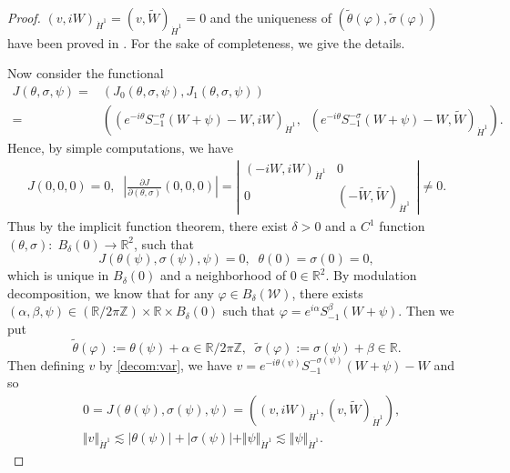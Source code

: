 \documentclass[reqno, 11pt]{amsart}
\numberwithin{equation}{section}
\newcommand{\Z}{{\mathbb{Z}}}
\newcommand{\R}{\mathbb{R}}
\theoremstyle{plain}
\theoremstyle{definition}
\numberwithin{equation}{section}
\numberwithin{theorem}{section}
\numberwithin{equation}{section}
\numberwithin{equation}{section}
\numberwithin{theorem}{section}
\begin{document}
	\begin{proof}
		$(v,iW)_{\dot H^1}=(v,\widetilde{W})_{\dot H^1}=0$ and the uniqueness of $(\widetilde{\theta}(\varphi),\widetilde{\sigma}(\varphi))$ have been proved in \cite[Lemma 4.1]{MWX:Hart}. For the sake of completeness, we give the details.
		
		Now consider the functional
		\begin{align*}
		J(\theta, \sigma, \psi)=&  \left(J_0(\theta, \sigma, \psi), J_1(\theta, \sigma, \psi)\right)\\ =&  \left( (e^{-i\theta}S_{-1}^{-\sigma}(W+\psi)-W, iW)_{\dot H^1},\;\; (e^{-i\theta}S_{-1}^{-\sigma}(W+\psi)-W, \widetilde{W})_{\dot H^1} \right).
		\end{align*}
		Hence, by simple computations, we have
		\begin{align*}
		J(0,0,0)=0, \;\; \left| \frac{\partial J}{\partial(\theta, \sigma)}
		(0,0,0)\right| = \left| \begin{array}{cc} (-iW,iW)_{\dot H^1} & 0\\
		0 &  (-\widetilde{W},\widetilde{W})_{\dot H^1} \end{array} \right|
		\not = 0.
		\end{align*}
		Thus by the implicit function theorem, there exist $\delta>0$ and a $C^1$ function $\left(\theta,\sigma\right):\;B_\delta(0)\rightarrow\R^2$, such that 
		\begin{equation*}
		J(\theta(\psi), \sigma(\psi), \psi)=0,\;\;\theta(0)=\sigma(0)=0,
		\end{equation*}
		which is unique in $B_\delta(0)$ and a neighborhood of $0\in \R^2$. By modulation decomposition, we know that for any $\varphi\in B_\delta(\mathcal{W})$, there exists $(\alpha,\beta,\psi)\in (\R/2\pi \Z)\times\R\times B_\delta(0)$ such that $\varphi=e^{i\alpha} S_{-1}^{\beta}(W+\psi)$. Then we put
		\begin{equation*}
		\widetilde{\theta}(\varphi):=\theta(\psi)+\alpha\in \R/2\pi \Z,\;\;\widetilde{\sigma}(\varphi):=\sigma(\psi)+\beta\in\R.
		\end{equation*}
		Then defining $v$ by \eqref{decom:var}, we have $v=e^{-i\theta(\psi)}S_{-1}^{-\sigma(\psi)}(W+\psi)-W$ and so
		\begin{align*}
		&0=J(\theta(\psi), \sigma(\psi), \psi)=\left( (v,iW)_{\dot H^1},(v,\widetilde{W})_{\dot H^1} \right),\\
		&\Vert  v\Vert_{\dot H^1}\lesssim |\theta(\psi)|+|\sigma(\psi)|+\Vert  \psi\Vert_{\dot H^1} \lesssim \Vert  \psi\Vert_{\dot H^1}.
		\end{align*}

\end{proof}
\end{document}
